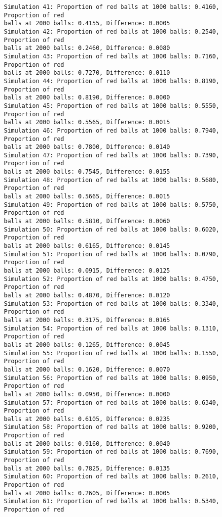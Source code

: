 \documentclass[11pt]{article}
\begin{document}
\begin{Verbatim}[commandchars=\\\{\}]
Simulation 41: Proportion of red balls at 1000 balls: 0.4160, Proportion of red
balls at 2000 balls: 0.4155, Difference: 0.0005
Simulation 42: Proportion of red balls at 1000 balls: 0.2540, Proportion of red
balls at 2000 balls: 0.2460, Difference: 0.0080
Simulation 43: Proportion of red balls at 1000 balls: 0.7160, Proportion of red
balls at 2000 balls: 0.7270, Difference: 0.0110
Simulation 44: Proportion of red balls at 1000 balls: 0.8190, Proportion of red
balls at 2000 balls: 0.8190, Difference: 0.0000
Simulation 45: Proportion of red balls at 1000 balls: 0.5550, Proportion of red
balls at 2000 balls: 0.5565, Difference: 0.0015
Simulation 46: Proportion of red balls at 1000 balls: 0.7940, Proportion of red
balls at 2000 balls: 0.7800, Difference: 0.0140
Simulation 47: Proportion of red balls at 1000 balls: 0.7390, Proportion of red
balls at 2000 balls: 0.7545, Difference: 0.0155
Simulation 48: Proportion of red balls at 1000 balls: 0.5680, Proportion of red
balls at 2000 balls: 0.5665, Difference: 0.0015
Simulation 49: Proportion of red balls at 1000 balls: 0.5750, Proportion of red
balls at 2000 balls: 0.5810, Difference: 0.0060
Simulation 50: Proportion of red balls at 1000 balls: 0.6020, Proportion of red
balls at 2000 balls: 0.6165, Difference: 0.0145
Simulation 51: Proportion of red balls at 1000 balls: 0.0790, Proportion of red
balls at 2000 balls: 0.0915, Difference: 0.0125
Simulation 52: Proportion of red balls at 1000 balls: 0.4750, Proportion of red
balls at 2000 balls: 0.4870, Difference: 0.0120
Simulation 53: Proportion of red balls at 1000 balls: 0.3340, Proportion of red
balls at 2000 balls: 0.3175, Difference: 0.0165
Simulation 54: Proportion of red balls at 1000 balls: 0.1310, Proportion of red
balls at 2000 balls: 0.1265, Difference: 0.0045
Simulation 55: Proportion of red balls at 1000 balls: 0.1550, Proportion of red
balls at 2000 balls: 0.1620, Difference: 0.0070
Simulation 56: Proportion of red balls at 1000 balls: 0.0950, Proportion of red
balls at 2000 balls: 0.0950, Difference: 0.0000
Simulation 57: Proportion of red balls at 1000 balls: 0.6340, Proportion of red
balls at 2000 balls: 0.6105, Difference: 0.0235
Simulation 58: Proportion of red balls at 1000 balls: 0.9200, Proportion of red
balls at 2000 balls: 0.9160, Difference: 0.0040
Simulation 59: Proportion of red balls at 1000 balls: 0.7690, Proportion of red
balls at 2000 balls: 0.7825, Difference: 0.0135
Simulation 60: Proportion of red balls at 1000 balls: 0.2610, Proportion of red
balls at 2000 balls: 0.2605, Difference: 0.0005
Simulation 61: Proportion of red balls at 1000 balls: 0.5340, Proportion of red

\end{Verbatim}
\end{document}
